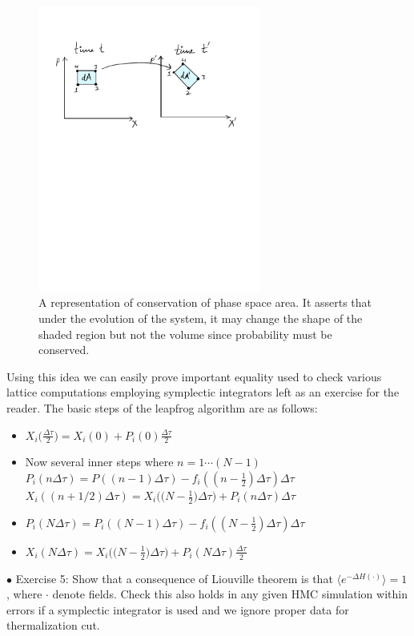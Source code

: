 \documentclass[letter,11pt]{article}
\begin{document}
\begin{figure}[htbp] 
	\centering 
	\includegraphics[width=0.65\textwidth]{figs/PSP.pdf}
	\caption{\label{fig:PSP1}A representation of conservation of phase space area. It asserts that under the evolution of the system, it may change the shape of the shaded region but not the volume since probability must be conserved.}
\end{figure}
Using this idea we can easily prove important equality used to check various lattice computations employing symplectic integrators left as an exercise for the reader. The basic steps of the leapfrog algorithm are as follows:
\begin{itemize}
	\item $X_{i}\big(\frac{\Delta \tau}{2}\big) = X_{i}(0) + P_{i}(0)\frac{\Delta \tau}{2}$
	\item Now several inner steps where $n =  1 \cdots (N-1)$
	\subitem $P_{i}(n \Delta \tau) = P((n-1) \Delta \tau) - f_{i}((n-\frac{1}{2}) \Delta \tau) \Delta \tau$ 
	\subitem $X_{i}((n + 1/2) \Delta \tau) = X_{i}\Big(\Big(N - \frac{1}{2}\Big) \Delta \tau\Big)  + P_{i}(n \Delta \tau) \Delta \tau$
	\item $P_{i}(N \Delta \tau) = P_{i}((N-1) \Delta \tau) - f_{i}((N-\frac{1}{2}) \Delta \tau) \Delta \tau$ 
	\item $X_{i}(N \Delta \tau) = X_{i}\Big(\Big(N - \frac{1}{2}\Big) \Delta \tau\Big) + P_{i}(N \Delta \tau) \frac{\Delta \tau}{2}$ 
\end{itemize} 
    \begin{mdframed}[backgroundcolor=blue!3] 
    \textsc{} 
    $\bullet$ Exercise 5: Show that a consequence of Liouville theorem is that $ \langle e^{-\Delta H(\boldsymbol{\cdot})} \rangle = 1$, where $\boldsymbol{\cdot}$ denote fields. Check this also holds in any given HMC simulation within errors if a symplectic integrator is used and we ignore proper data for thermalization cut.
    \end{mdframed} 
\end{document}
